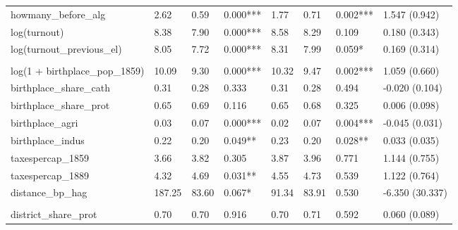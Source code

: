 \begin{table}[!h]
\begin{threeparttable}
{\begin{tabular}[t]{llllllll}
\hspace{1em}howmany\_before\_alg & \num{2.62} & \num{0.59} & 0.000*** & \num{1.77} & \num{0.71} & 0.002*** & 1.547 (0.942)\\
\hspace{1em}log(turnout) & \num{8.38} & \num{7.90} & 0.000*** & \num{8.58} & \num{8.29} & 0.109 & 0.180 (0.343)\\
\hspace{1em}log(turnout\_previous\_el) & \num{8.05} & \num{7.72} & 0.000*** & \num{8.31} & \num{7.99} & 0.059* & 0.169 (0.314)\\
\addlinespace[0.3em]
\multicolumn{8}{l}{\textbf{Panel D: Birthplace Characteristics}}\\
\hspace{1em}log(1 + birthplace\_pop\_1859) & \num{10.09} & \num{9.30} & 0.000*** & \num{10.32} & \num{9.47} & 0.002*** & 1.059 (0.660)\\
\hspace{1em}birthplace\_share\_cath & \num{0.31} & \num{0.28} & 0.333 & \num{0.31} & \num{0.28} & 0.494 & -0.020 (0.104)\\
\hspace{1em}birthplace\_share\_prot & \num{0.65} & \num{0.69} & 0.116 & \num{0.65} & \num{0.68} & 0.325 & 0.006 (0.098)\\
\hspace{1em}birthplace\_agri & \num{0.03} & \num{0.07} & 0.000*** & \num{0.02} & \num{0.07} & 0.004*** & -0.045 (0.031)\\
\hspace{1em}birthplace\_indus & \num{0.22} & \num{0.20} & 0.049** & \num{0.23} & \num{0.20} & 0.028** & 0.033 (0.035)\\
\hspace{1em}taxespercap\_1859 & \num{3.66} & \num{3.82} & 0.305 & \num{3.87} & \num{3.96} & 0.771 & 1.144 (0.755)\\
\hspace{1em}taxespercap\_1889 & \num{4.32} & \num{4.69} & 0.031** & \num{4.55} & \num{4.73} & 0.539 & 1.122 (0.764)\\
\hspace{1em}distance\_bp\_hag & \num{187.25} & \num{83.60} & 0.067* & \num{91.34} & \num{83.91} & 0.530 & -6.350 (30.337)\\
\addlinespace[0.3em]
\multicolumn{8}{l}{\textbf{Panel E: District Characteristics}}\\
\hspace{1em}district\_share\_prot & \num{0.70} & \num{0.70} & 0.916 & \num{0.70} & \num{0.71} & 0.592 & 0.060 (0.089)\\

\end{tabular}}
\end{threeparttable}
\end{table}
